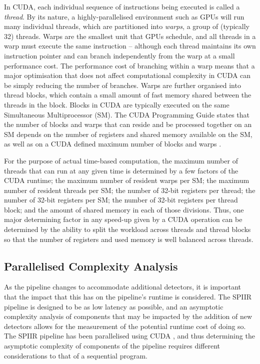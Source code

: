 \documentclass{article}
\begin{document}
In CUDA, each individual sequence of instructions being executed is called a \textit{thread}.
By its nature, a highly-parallelised environment such as GPUs will run many individual threads, which are partitioned into \textit{warps}, a group of (typically 32) threads.
Warps are the smallest unit that GPUs schedule, and all threads in a warp must execute the same instruction -- although each thread maintains its own instruction pointer and can branch independently from the warp at a small performance cost.
The performance cost of branching within a warp means that a major optimisation that does not affect computational complexity in CUDA can be simply reducing the number of branches.
Warps are further organised into thread blocks, which contain a small amount of fast memory shared between the threads in the block.
Blocks in CUDA are typically executed on the same Simultaneous Multiprocessor (SM).
The CUDA Programming Guide states that the number of blocks and warps that can reside and be processed together on an SM depends on the number of registers and shared memory available on the SM, as well as on a CUDA defined maximum number of blocks and warps \cite{CUDA_Guide}.

For the purpose of actual time-based computation, the maximum number of threads that can run at any given time is determined by a few factors of the CUDA runtime; the maximum number of resident warps per SM; the maximum number of resident threads per SM; the number of 32-bit registers per thread; the number of 32-bit registers per SM; the number of 32-bit registers per thread block; and the amount of shared memory in each of those divisions.
Thus, one major determining factor in any speed-up given by a CUDA operation can be determined by the ability to split the workload across threads and thread blocks so that the number of registers and used memory is well balanced across threads.

\subsection{Parallelised Complexity Analysis} \label{sec:lit_review:par_comp_analysis}

As the pipeline changes to accommodate additional detectors, it is important that the impact that this has on the pipeline's runtime is considered.
The SPIIR pipeline is designed to be as low latency as possible, and an asymptotic complexity analysis of components that may be impacted by the addition of new detectors allows for the measurement of the potential runtime cost of doing so.
The SPIIR pipeline has been parallelised using CUDA \cite{SPIIRGPU2018}, and thus determining the asymptotic complexity of components of the pipeline requires different considerations to that of a sequential program.
\\
\end{document}
